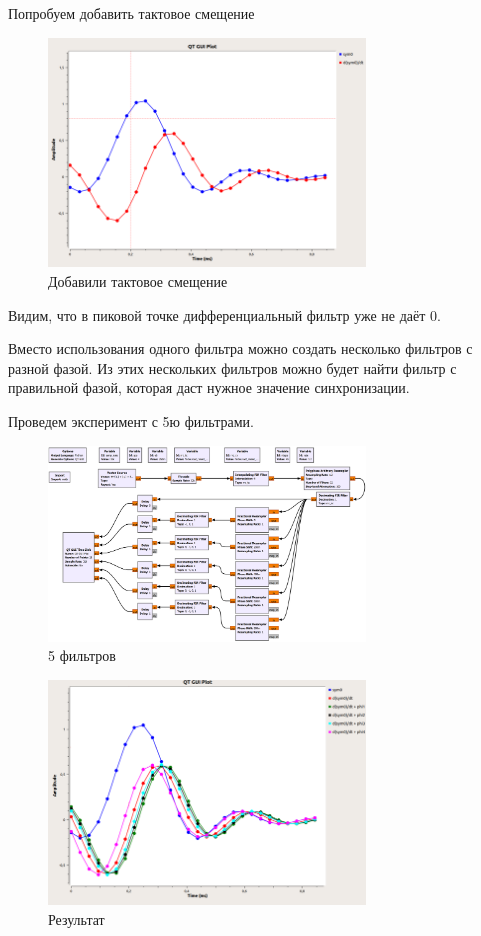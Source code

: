 \documentclass[a4paper,12pt]{article}
\begin{document}
	Попробуем добавить тактовое смещение
	
	\begin{figure}[H]
		\centering
		\includegraphics[width=0.75\textwidth]{3_7.png}
		\caption{Добавили тактовое смещение}
		\label{fig:3.6}
	\end{figure}

	Видим, что в пиковой точке дифференциальный фильтр уже не даёт 0.
	
	Вместо использования одного фильтра можно создать несколько фильтров с разной фазой. Из этих нескольких фильтров можно будет найти фильтр с правильной фазой, которая даст нужное значение синхронизации. 
	
	Проведем эксперимент с 5ю фильтрами.
	
	\begin{figure}[H]
		\centering
		\includegraphics[width=0.75\textwidth]{3_8.png}
		\caption{5 фильтров}
		\label{fig:3.8}
	\end{figure}
	
	\begin{figure}[H]
		\centering
		\includegraphics[width=0.75\textwidth]{3_9.png}
		\caption{Результат}
		\label{fig:3.9}
	\end{figure}
\end{document}
